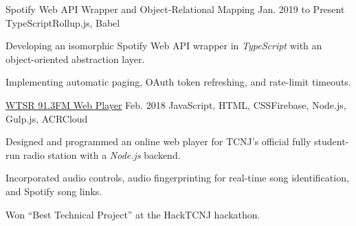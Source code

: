 
\begin{cventry}
    {Spotify Web API Wrapper and Object-Relational Mapping}{}
    {Jan. 2019 to Present}
    {TypeScript}{Rollup.js, Babel}
    \begin{cvitems}
        \item Developing an isomorphic Spotify Web API wrapper in \textsl{TypeScript} with an object-oriented abstraction layer.
        \item Implementing automatic paging, OAuth token refreshing, and rate-limit timeouts.
    \end{cvitems}  
\end{cventry}

\begin{comment}
    \begin{cventry}
        {Functional Linear Algebra Library}{}
        {Aug. to Dec. 2018}
        {Kotlin}{Gradle}
        \begin{cvitems}
            \item Implemented a functional linear algebra library with lazy evaluation and function composition.
            \item Inspired by the Kotlin Sequence interface.
        \end{cvitems}  
    \end{cventry}
\end{comment}

\begin{comment}
    \begin{cventry}
        {\href{https://github.com/TomerAberbach/tomeraberbach.github.io}{Tomer Aberbach Static Website Generator}}{}
        {May to July 2018}
        {JavaScript, HTML, Markdown, Handlebars, CSS, SVG, YAML}{Node.js, Gulp.js}
        \begin{cvitems}
            \item Designed and developed a static website generator for my portfolio website.
            \item Automated pagination and optimized assets using transpilation and minification.
        \end{cvitems}  
    \end{cventry}
\end{comment}

\begin{cventry}
    {\href{https://wtsr.tomeraberba.ch}{WTSR 91.3FM Web Player}}{}
    {Feb. 2018}
    {JavaScript, HTML, CSS}{Firebase, Node.js, Gulp.js, ACRCloud}
    \begin{cvitems}
        \item Designed and programmed an online web player for TCNJ's official fully student-run radio station with a \textsl{Node.js} backend.
        \item Incorporated audio controls, audio fingerprinting for real-time song identification, and Spotify song links.
        \item Won ``Best Technical Project'' at the HackTCNJ hackathon.
    \end{cvitems}
\end{cventry}

